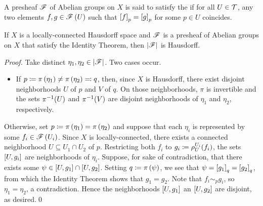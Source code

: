 \documentclass[../Moduli_Spaces_of_Riemann_Surfaces.tex]{subfiles}
\begin{document}
    \begin{definition}
        A presheaf $\mathscr{F}$ of Abelian groups on $X$ is said to satisfy the  if for all $U\in\mathcal{T}$, any two elements $f,g\in\mathscr{F}\left(U\right)$ such that $\left[f\right]_p=\left[g\right]_p$ for some $p\in U$ coincides.
    \end{definition}
    \begin{proposition}\label{2.2:prp:stalk_topology_Hausdorff}
        If $X$ is a locally-connected Hausdorff space and $\mathscr{F}$ is a presheaf of Abelian groups on $X$ that satisfy the Identity Theorem, then $\left|\mathscr{F}\right|$ is Hausdorff.
    \end{proposition}
    \begin{proof}
        Take distinct $\eta_1,\eta_2\in\left|\mathscr{F}\right|$. Two cases occur.
        \begin{itemize}
            \item If $p\coloneqq\pi\left(\eta_1\right)\neq\pi\left(\eta_2\right)\eqqcolon q$, then, since $X$ is Hausdorff, there exist disjoint neighborhoods $U$ of $p$ and $V$ of $q$. On those neighborhoods, $\pi$ is invertible and the sets $\pi^{-1}\!\left(U\right)$ and $\pi^{-1}\!\left(V\right)$ are disjoint neighborhoods of $\eta_1$ and $\eta_2$, respectively.
        \end{itemize}
        Otherwise, set $p\coloneqq\pi\left(\eta_1\right)=\pi\left(\eta_2\right)$ and suppose that each $\eta_i$ is represented by some $f_i\in\mathscr{F}\left(U_i\right)$. Since $X$ is locally-connected, there exists a connected neighborhood $U\subseteq U_1\cap U_2$ of $p$. Restricting both $f_i$ to $g_i\coloneqq\rho^{U_i}_U\!\left(f_i\right)$, the sets $\left[U,g_i\right]$ are neighborhoods of $\eta_i$. Suppose, for sake of contradiction, that there exists some $\psi\in\left[U,g_1\right]\cap\left[U,g_2\right]$. Setting $q\coloneqq\pi\left(\psi\right)$, we see that $\psi=\left[g_1\right]_q=\left[g_2\right]_q$, from which the Identity Theorem shows that $g_1=g_2$. Note that $f_i\sim_pg_i$, so $\eta_1=\eta_2$, a contradiction. Hence the neighborhoods $\left[U,g_1\right]$ an $\left[U,g_2\right]$ are disjoint, as desired.\qed
    \end{proof}
\end{document}
